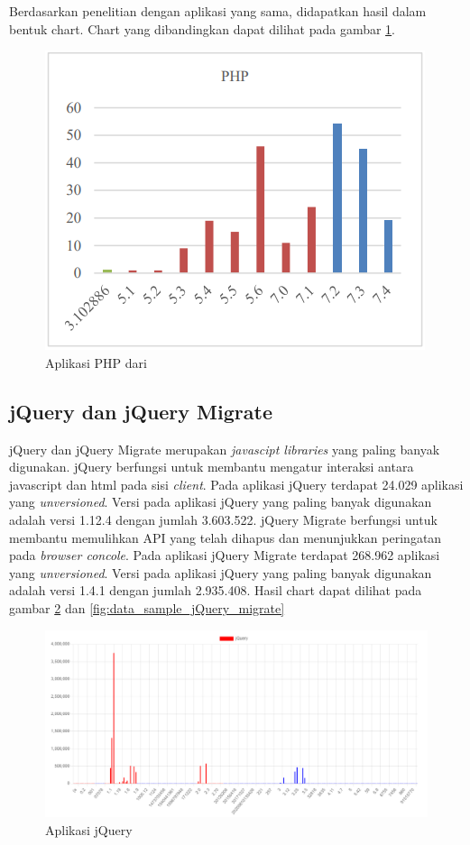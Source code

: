 Berdasarkan penelitian dengan aplikasi yang sama, didapatkan hasil dalam bentuk chart. Chart yang dibandingkan dapat dilihat pada gambar \ref{fig:data_sample_php_p}.

\begin{figure}[H]
	\centering  
	\includegraphics[scale=0.7]{Gambar/chart_pascal_php.PNG}  
	\caption{Aplikasi PHP dari \cite{pascal}} 
	\label{fig:data_sample_php_p} 
\end{figure}

\subsection{jQuery dan jQuery Migrate}
jQuery dan jQuery Migrate merupakan \textit{javascipt libraries} yang paling banyak digunakan. jQuery berfungsi untuk membantu mengatur interaksi antara javascript dan html pada sisi \textit{client}. Pada aplikasi jQuery terdapat 24.029 aplikasi yang \textit{unversioned}. Versi pada aplikasi jQuery yang paling banyak digunakan adalah versi 1.12.4 dengan jumlah 3.603.522. jQuery Migrate berfungsi untuk membantu memulihkan API yang telah dihapus dan menunjukkan peringatan pada \textit{browser concole}. Pada aplikasi jQuery Migrate terdapat 268.962 aplikasi yang \textit{unversioned}. Versi pada aplikasi jQuery yang paling banyak digunakan adalah versi 1.4.1 dengan jumlah 2.935.408. Hasil chart dapat dilihat pada gambar \ref{fig:data_sample_jQuery} dan  \ref{fig:data_sample_jQuery_migrate}
\begin{figure}[H]
	\centering  
	\includegraphics[scale=0.7]{Gambar/data_sample_jQuery.png}  
	\caption{Aplikasi jQuery} 
	\label{fig:data_sample_jQuery} 
\end{figure}

